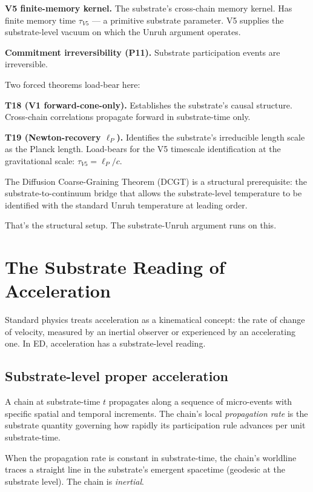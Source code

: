 \documentclass[11pt,a4paper]{article}
\begin{document}
\textbf{V5 finite-memory kernel.} The substrate's cross-chain memory kernel. Has finite memory time $\tau_{V5}$ --- a primitive substrate parameter. V5 supplies the substrate-level vacuum on which the Unruh argument operates.

\textbf{Commitment irreversibility (P11).} Substrate participation events are irreversible.

Two forced theorems load-bear here:

\textbf{T18 (V1 forward-cone-only).} Establishes the substrate's causal structure. Cross-chain correlations propagate forward in substrate-time only.

\textbf{T19 (Newton-recovery $\ell_P$).} Identifies the substrate's irreducible length scale as the Planck length. Load-bears for the V5 timescale identification at the gravitational scale: $\tau_{V5} = \ell_P/c$.

The Diffusion Coarse-Graining Theorem (DCGT) is a structural prerequisite: the substrate-to-continuum bridge that allows the substrate-level temperature to be identified with the standard Unruh temperature at leading order.

That's the structural setup. The substrate-Unruh argument runs on this.

\section{The Substrate Reading of Acceleration}

Standard physics treats acceleration as a kinematical concept: the rate of change of velocity, measured by an inertial observer or experienced by an accelerating one. In ED, acceleration has a substrate-level reading.

\subsection{Substrate-level proper acceleration}

A chain at substrate-time $t$ propagates along a sequence of micro-events with specific spatial and temporal increments. The chain's local \emph{propagation rate} is the substrate quantity governing how rapidly its participation rule advances per unit substrate-time.

When the propagation rate is constant in substrate-time, the chain's worldline traces a straight line in the substrate's emergent spacetime (geodesic at the substrate level). The chain is \emph{inertial}.
\end{document}
